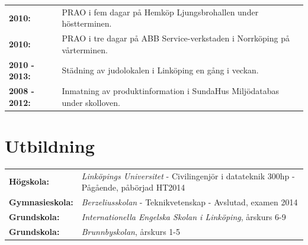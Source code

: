 \documentclass[a4paper,notitlepage]{article}
\begin{document}
\begin{tabular}{@{}l p{13cm}}
\textbf{2010:} & PRAO i fem dagar på Hemköp Ljungsbrohallen under
höstterminen. \\

\textbf{2010:} & PRAO i tre dagar på ABB Service-verkstaden i
Norrköping på vårterminen. \\

\textbf{2010 - 2013:} & Städning av judolokalen i Linköping en gång
i veckan. \\

\textbf{2008 - 2012:} & Inmatning av produktinformation i SundaHus Miljödatabas under
skolloven.	\\

	\end{tabular}

\section*{Utbildning}
\noindent\begin{tabular}{@{}l p{11cm}}
	\textbf{Högskola:} & \textit{Linköpings Universitet} - Civilingenjör i
	datateknik 300hp - Pågående, påbörjad HT2014 \\

	\textbf{Gymnasieskola:} & \textit{Berzeliusskolan} - Teknikvetenskap -
	Avslutad, examen 2014 \\

	\textbf{Grundskola:} & \textit{Internationella Engelska Skolan i Linköping},
	årskurs 6-9 \\

	\textbf{Grundskola:} & \textit{Brunnbyskolan}, årskurs 1-5 \\
	\end{tabular}
\end{document}
